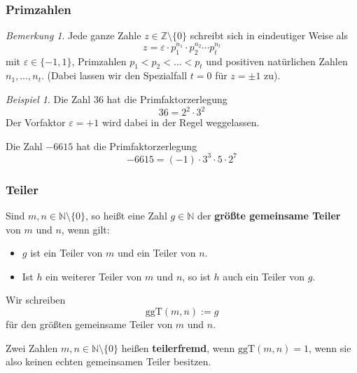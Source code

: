\documentclass[hyperref={pdfpagelabels=false}]{beamer}
\theoremstyle{plain}%
\theoremstyle{definition}
\theoremstyle{remark}
\newtheorem*{beispiel}{Beispiel}
\newtheorem*{notiz}{Bemerkung}
\begin{document}
\begin{frame}
\frametitle{Primzahlen}

\begin{notiz} Jede ganze Zahle $z \in \mathbb Z \setminus \{ 0 \}$ schreibt sich in eindeutiger Weise als
  	$$ z = \varepsilon \cdot p_1^{n_1} \cdot p_2^{n_2} \cdots p_t^{n_t} $$
mit $\varepsilon \in \{-1,1\}$, Primzahlen $p_1 < p_2 < \ldots < p_t$ und positiven natürlichen Zahlen 
$n_1, \ldots , n_t$. (Dabei lassen wir den Spezialfall $t = 0$ für $z = \pm 1$ zu).
\end{notiz}

\pause 

\begin{beispiel}
Die Zahl $36$ hat die Primfaktorzerlegung
	$$ 36 = 2^2 \cdot 3^2 $$ 
Der Vorfaktor $\varepsilon = +1$ wird dabei in der Regel weggelassen. \pause 

Die Zahl $-6615$ hat die Primfaktorzerlegung 
	$$ -6615 = (-1) \cdot 3^3 \cdot 5 \cdot 2^7 $$
\end{beispiel}

\end{frame}

\begin{frame}
\frametitle{Teiler}

\begin{definition} Sind $m,n \in \mathbb N \setminus \{0 \}$, so heißt eine Zahl $g \in \mathbb N$ der 
\textbf{größte gemeinsame Teiler} von $m$ und $n$, wenn gilt:
\begin{itemize}
\item<2-> $g$ ist ein Teiler von $m$ und ein Teiler von $n$.
\item<3-> Ist $h$ ein weiterer Teiler von $m$ und $n$, so ist $h$ auch ein Teiler von $g$.
\end{itemize}

\pause \pause \pause 
Wir schreiben 
	$$ \mathrm{ggT}(m,n) := g $$ 
für den größten gemeinsame Teiler von $m$ und $n$.

\pause 
Zwei Zahlen $m,n \in \mathbb N \setminus \{0 \}$ heißen \textbf{teilerfremd}, wenn 
$\textrm{ggT}(m,n) = 1$, wenn sie also keinen echten gemeinsamen Teiler besitzen.
\end{definition}
\end{frame}
\end{document}
